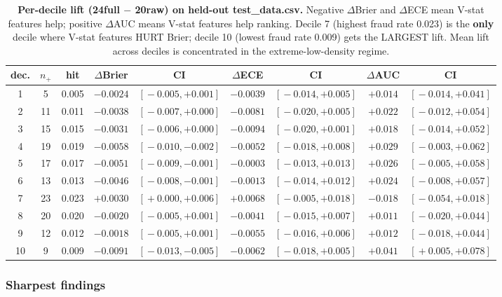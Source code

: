 \documentclass{article}
\begin{document}
\begin{table}[h]
\centering
\small
\begin{tabular}{ccccccccc}
\hline
dec. & $n_+$ & hit & $\Delta$Brier & CI & $\Delta$ECE & CI & $\Delta$AUC & CI \\
\hline
1 & 5 & 0.005 & $-0.0024$ & $[\!-0.005, +0.001]$ & $-0.0039$ & $[\!-0.014, +0.005]$ & $+0.014$ & $[\!-0.014, +0.041]$ \\
2 & 11 & 0.011 & $-0.0038$ & $[\!-0.007, +0.000]$ & $-0.0081$ & $[\!-0.020, +0.005]$ & $+0.022$ & $[\!-0.012, +0.054]$ \\
3 & 15 & 0.015 & $-0.0031$ & $[\!-0.006, +0.000]$ & $-0.0094$ & $[\!-0.020, +0.001]$ & $+0.018$ & $[\!-0.014, +0.052]$ \\
4 & 19 & 0.019 & $-0.0058$ & $[\!-0.010, -0.002]$ & $-0.0052$ & $[\!-0.018, +0.008]$ & $+0.029$ & $[\!-0.003, +0.062]$ \\
5 & 17 & 0.017 & $-0.0051$ & $[\!-0.009, -0.001]$ & $-0.0003$ & $[\!-0.013, +0.013]$ & $+0.026$ & $[\!-0.005, +0.058]$ \\
6 & 13 & 0.013 & $-0.0046$ & $[\!-0.008, -0.001]$ & $-0.0013$ & $[\!-0.014, +0.012]$ & $+0.024$ & $[\!-0.008, +0.057]$ \\
7 & 23 & 0.023 & $+0.0030$ & $[\!+0.000, +0.006]$ & $+0.0068$ & $[\!-0.005, +0.018]$ & $-0.018$ & $[\!-0.054, +0.018]$ \\
8 & 20 & 0.020 & $-0.0020$ & $[\!-0.005, +0.001]$ & $-0.0041$ & $[\!-0.015, +0.007]$ & $+0.011$ & $[\!-0.020, +0.044]$ \\
9 & 12 & 0.012 & $-0.0018$ & $[\!-0.005, +0.001]$ & $-0.0055$ & $[\!-0.016, +0.006]$ & $+0.012$ & $[\!-0.018, +0.044]$ \\
10 & 9 & 0.009 & $-0.0091$ & $[\!-0.013, -0.005]$ & $-0.0062$ & $[\!-0.018, +0.005]$ & $+0.041$ & $[\!+0.005, +0.078]$ \\
\hline
\end{tabular}
\caption{\textbf{Per-decile lift (24full $-$ 20raw) on held-out test\_data.csv.}
Negative $\Delta$Brier and $\Delta$ECE mean V-stat features help; positive $\Delta$AUC
means V-stat features help ranking. Decile 7 (highest fraud rate 0.023) is the
\textbf{only} decile where V-stat features HURT Brier; decile 10 (lowest fraud rate
0.009) gets the LARGEST lift. Mean lift across deciles is concentrated in the
extreme-low-density regime.}
\label{tab:p8-iter192-decile}
\end{table}

\subsubsection{Sharpest findings}\label{sec:p8-iter192-findings}
\end{document}
